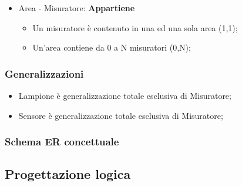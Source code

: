 \begin{itemize}

    \item Area - Misuratore: \textbf{Appartiene}
    \begin{itemize}
        \item Un misuratore è contenuto in una ed una sola area (1,1);
        \item Un'area contiene da 0 a N misuratori (0,N);
    \end{itemize}
    
\end{itemize}

\subsubsection{Generalizzazioni}

\begin{itemize}
    \item Lampione è generalizzazione totale esclusiva di Misuratore;
    \item Sensore è generalizzazione totale esclusiva di Misuratore;
\end{itemize}

\subsubsection{Schema ER concettuale}

\subsection{Progettazione logica}